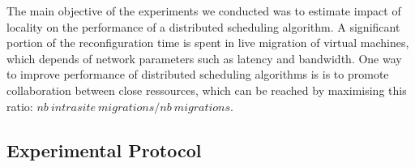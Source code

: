 
%
%
%




The main objective of the experiments we conducted was to estimate impact of locality on
the performance of a distributed scheduling algorithm. A significant portion of the
reconfiguration time is spent in live migration of virtual machines, which depends of
network parameters such as latency and bandwidth. One way to improve performance of
distributed scheduling algorithms is is to promote collaboration between close ressources,
which can be reached by maximising this ratio: $nb\ intrasite\ migrations/nb\ migrations$.


\subsection{Experimental Protocol}

